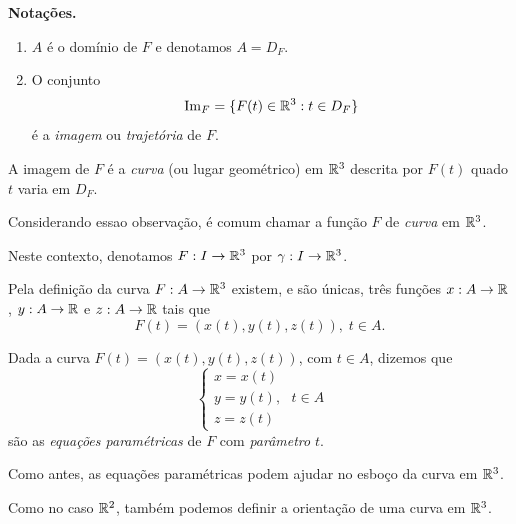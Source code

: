 \textbf{Notações. }
    \begin{enumerate}
        \item \(A\) é o domínio de \(F\) e denotamos \(A = D_F\).
        \item O conjunto \[\operatorname{Im}_F = \{F(t)\in\mathbb{R}^3 : t\in D_F\}\] é a \textit{imagem} ou \textit{trajetória} de \(F\).
    \end{enumerate}

\begin{remark}
    A imagem de \(F\) é a \textit{curva} (ou lugar geométrico) em \(\mathbb{R}^3\) descrita por \(F(t)\) quado \(t\) varia em \(D_F\).
\end{remark}

Considerando essao observação, é comum chamar a função \(F\) de \textit{curva} em \(\mathbb{R}^3\).

Neste contexto, denotamos \(F:I\to\mathbb{R}^3\) por \(\gamma:I\to\mathbb{R}^3\).

\begin{remark}
    Pela definição da curva \(F:A\to\mathbb{R}^3\) existem, e são únicas, três funções \(x : A\to\mathbb{R}\), \(y:A\to\mathbb{R}\) e \(z:A\to\mathbb{R}\) tais que \[F(t) = (x(t),y(t),z(t)),\; t\in A.\]%
\end{remark}

\begin{definition}
    Dada a curva \(F(t) = (x(t),y(t),z(t))\), com \(t\in A\), dizemos que \[\begin{cases}
        x = x(t)\\
        y = y(t),\\
        z = z(t)
    \end{cases}\; t\in A \] são as \textit{equações paramétricas}\label{Curva!Equações paramétricas} de \(F\) com \textit{parâmetro} \(t\).
\end{definition}

\begin{remark}
    Como antes, as equações paramétricas podem ajudar no esboço da curva em \(\mathbb{R}^3\).
\end{remark}

Como no caso \(\mathbb{R}^2\), também podemos definir a orientação de uma curva em \(\mathbb{R}^3\).

